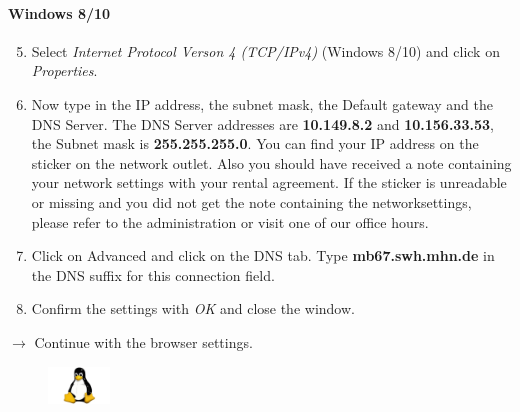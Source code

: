 \documentclass[a4paper,12pt]{scrartcl}
\begin{document}
\paragraph*{Windows 8/10}
\begin{enumerate}
    \setcounter{enumi}{4}
	\item Select \emph{Internet Protocol Verson 4 (TCP/IPv4)} (Windows 8/10) and click on \emph{Properties}.
    \item Now type in the IP address, the subnet mask, the Default gateway and the DNS Server. The DNS Server addresses are \textbf{10.149.8.2} and \textbf{10.156.33.53}, the Subnet mask is \textbf{255.255.255.0}. You can find your IP address on the sticker on the network outlet. Also you should have received a note containing your network settings with your rental agreement. If the sticker is unreadable or missing and you did not get the note containing the networksettings, please refer to the administration or visit one of our office hours.
    \item Click on Advanced and click on the DNS tab. Type \textbf{mb67.swh.mhn.de} in the DNS suffix for this connection field.
	\item Confirm the settings with \emph{OK} and close the window.
\end{enumerate}
$\rightarrow$ Continue with the browser settings.


\pagebreak

\begin{figure}[t!]
    \raggedleft
    \vspace{-20pt}
    \includegraphics[height=1cm,keepaspectratio]{Bilder/linux_logo_neu}
    \vspace{-30pt}
\end{figure}
\end{document}
